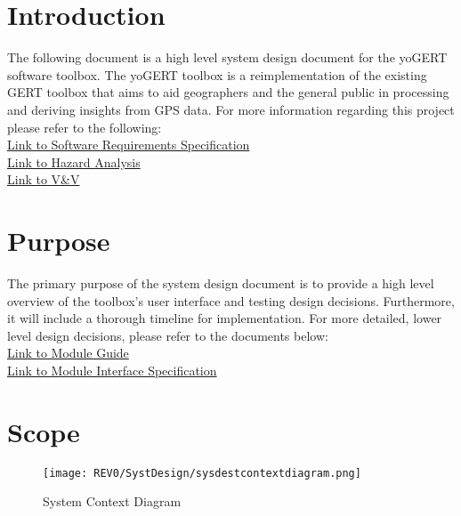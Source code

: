 \documentclass[12pt, titlepage]{article}
\begin{document}
\listoffigures

\newpage


\section{Introduction}
The following document is a high level system design document for the yoGERT software toolbox. The yoGERT toolbox is a reimplementation of the existing GERT toolbox that aims to aid geographers and the general public in processing and deriving insights from GPS data. For more information regarding this project please refer to the following: \\

\noindent\href{../../SRS/SRS.pdf}{Link to Software Requirements Specification}\\
\noindent\href{../../HazardAnalysis/HazardAnalysis.pdf}{Link to Hazard Analysis}\\
\noindent\href{../../VnVPlan/VnVPlan.pdf}{Link to V\&V}\\



\section{Purpose}

The primary purpose of the system design document is to provide a high level overview of the toolbox's user interface and testing design decisions. Furthermore, it will include a thorough timeline for implementation. For more detailed, lower level design decisions, please refer to the documents below: \\

\noindent\href{../../Design/MG/MG.pdf}{Link to Module Guide}\\
\noindent\href{../../Design/MIS/MIS.pdf}{Link to Module Interface Specification}\\

\section{Scope}
\begin{figure}[!h]
    \centering
    \texttt{[image: REV0/SystDesign/sysdestcontextdiagram.png]}
    \caption{System Context Diagram}
    \label{fig:System_Context_Diagram}
\end{figure}
\end{document}

